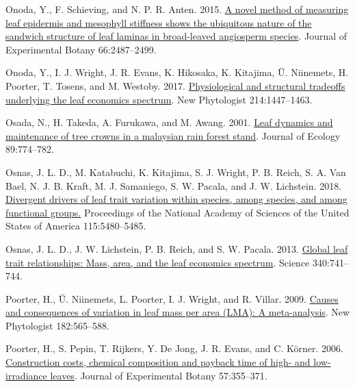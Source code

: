\documentclass[
  12pt,
]{article}
\newlength{\cslhangindent} %
\newlength{\cslentryspacingunit} %
\newenvironment{CSLReferences}[2] %
 {%
  \setlength{\parindent}{0pt} %
  \ifodd #1 %
  \let\oldpar\par %
  \def\par{\hangindent=\cslhangindent\oldpar} %
  \fi %
  \setlength{\parskip}{#2\cslentryspacingunit} %
 }%
 {} %
\begin{document}
\begin{CSLReferences}{1}{0}
\leavevmode{}%
Onoda, Y., F. Schieving, and N. P. R. Anten. 2015. \href{https://doi.org/10.1093/jxb/erv024}{A novel method of measuring leaf epidermis and mesophyll stiffness shows the ubiquitous nature of the sandwich structure of leaf laminas in broad-leaved angiosperm species}. Journal of Experimental Botany 66:2487--2499.

\leavevmode{}%
Onoda, Y., I. J. Wright, J. R. Evans, K. Hikosaka, K. Kitajima, Ü. Niinemets, H. Poorter, T. Tosens, and M. Westoby. 2017. \href{https://doi.org/10.1111/nph.14496}{Physiological and structural tradeoffs underlying the leaf economics spectrum}. New Phytologist 214:1447--1463.

\leavevmode{}%
Osada, N., H. Takeda, A. Furukawa, and M. Awang. 2001. \href{https://doi.org/10.1046/j.0022-0477.2001.00590.x}{Leaf dynamics and maintenance of tree crowns in a malaysian rain forest stand}. Journal of Ecology 89:774--782.

\leavevmode{}%
Osnas, J. L. D., M. Katabuchi, K. Kitajima, S. J. Wright, P. B. Reich, S. A. Van Bael, N. J. B. Kraft, M. J. Samaniego, S. W. Pacala, and J. W. Lichstein. 2018. \href{https://doi.org/10.1073/pnas.1803989115}{Divergent drivers of leaf trait variation within species, among species, and among functional groups.} Proceedings of the National Academy of Sciences of the United States of America 115:5480--5485.

\leavevmode{}%
Osnas, J. L. D., J. W. Lichstein, P. B. Reich, and S. W. Pacala. 2013. \href{https://doi.org/10.1126/science.1231574}{Global leaf trait relationships: {Mass}, area, and the leaf economics spectrum}. Science 340:741--744.

\leavevmode{}%
Poorter, H., Ü. Niinemets, L. Poorter, I. J. Wright, and R. Villar. 2009. \href{https://doi.org/10.1111/j.1469-8137.2009.02830.x}{Causes and consequences of variation in leaf mass per area ({LMA}): {A} meta-analysis}. New Phytologist 182:565--588.

\leavevmode{}%
Poorter, H., S. Pepin, T. Rijkers, Y. De Jong, J. R. Evans, and C. Körner. 2006. \href{https://doi.org/10.1093/jxb/erj002}{Construction costs, chemical composition and payback time of high- and low-irradiance leaves}. Journal of Experimental Botany 57:355--371.


\end{CSLReferences}
\end{document}
